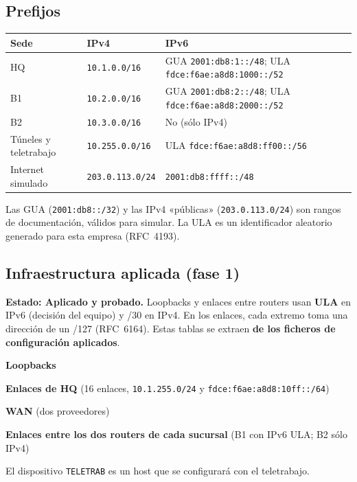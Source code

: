 \documentclass[11pt,a4paper]{article}
\newcommand{\cod}[1]{\texttt{#1}}
\newcommand{\ok}{\textcolor{verde}{\textbf{Aplicado y probado}}}
\begin{document}
\subsection{Prefijos}
\begin{longtable}{@{}p{2.2cm}p{4.4cm}p{9.9cm}@{}}
\toprule
\textbf{Sede} & \textbf{IPv4} & \textbf{IPv6}\\
\midrule
\endhead
HQ & \cod{10.1.0.0/16} & GUA \cod{2001:db8:1::/48}; ULA \cod{fdce:f6ae:a8d8:1000::/52}\\
B1 & \cod{10.2.0.0/16} & GUA \cod{2001:db8:2::/48}; ULA \cod{fdce:f6ae:a8d8:2000::/52}\\
B2 & \cod{10.3.0.0/16} & No (sólo IPv4)\\
Túneles y teletrabajo & \cod{10.255.0.0/16} & ULA \cod{fdce:f6ae:a8d8:ff00::/56}\\
Internet simulado & \cod{203.0.113.0/24} & \cod{2001:db8:ffff::/48}\\
\bottomrule
\end{longtable}
Las GUA (\cod{2001:db8::/32}) y las IPv4 «públicas» (\cod{203.0.113.0/24}) son rangos de documentación, válidos para simular. La ULA es un identificador aleatorio generado para esta empresa (RFC~4193).

\subsection{Infraestructura aplicada (fase 1)}\label{sec:infra}
\textbf{Estado: \ok.} Loopbacks y enlaces entre routers usan \textbf{ULA} en IPv6 (decisión del equipo) y /30 en IPv4. En los enlaces, cada extremo toma una dirección de un /127 (RFC~6164). Estas tablas se extraen \textbf{de los ficheros de configuración aplicados}.

\textbf{Loopbacks}


\textbf{Enlaces de HQ} (16 enlaces, \cod{10.1.255.0/24} y \cod{fdce:f6ae:a8d8:10ff::/64})


\textbf{WAN} (dos proveedores)

\textbf{Enlaces entre los dos routers de cada sucursal} (B1 con IPv6 ULA; B2 sólo IPv4)

El dispositivo \cod{TELETRAB} es un host que se configurará con el teletrabajo.
\end{document}
